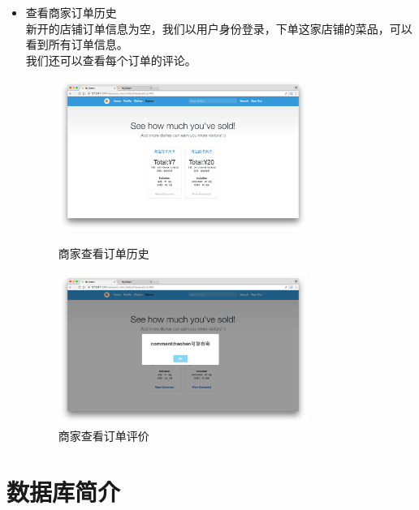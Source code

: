\documentclass[12pt, oneside,a4paper]{article}
\begin{document}
\begin{itemize}
\begin{figure}[H]
   \end{figure}
  \item 查看商家订单历史\\
  新开的店铺订单信息为空，我们以用户身份登录，下单这家店铺的菜品，可以看到所有订单信息。\\
  我们还可以查看每个订单的评论。
  \begin{figure}[H]
   \begin{minipage}[t]{0.5\linewidth}
    \centering
     \includegraphics[width=3.2in]{re-order.jpg}
     \caption{\small{商家查看订单历史}}
   \end{minipage}
   \begin{minipage}[t]{0.5\linewidth}
    \centering
     \includegraphics[width=3.2in]{re-order-comment.jpg}
      \caption{\small{商家查看订单评价}}
   \end{minipage}
   \end{figure}
  \end{itemize}

\section{数据库简介}
\end{document}
